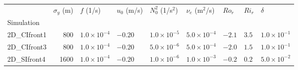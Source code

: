\begin{tabular}{lrlllllll}
\toprule
{} &  $\sigma_y$ (m) &             $f$ (1/s) & $u_0$ (m/s) &     $N^2_0$ (1/s$^2$) &     $\nu_e$ (m$^2$/s) &  $Ro_r$ & $Ri_r$ &              $\delta$ \\
Simulation   &                 &                       &             &                       &                       &         &        &                       \\
\midrule
2D\_CIfront1 &             800 &  $1.0 \times 10^{-4}$ &     $-0.20$ &  $1.0 \times 10^{-5}$ &  $5.0 \times 10^{-4}$ &  $-2.1$ &  $3.5$ &  $1.0 \times 10^{-1}$ \\
2D\_CIfront3 &             800 &  $1.0 \times 10^{-4}$ &     $-0.20$ &  $5.0 \times 10^{-6}$ &  $5.0 \times 10^{-4}$ &  $-2.0$ &  $1.5$ &  $1.0 \times 10^{-1}$ \\
2D\_SIfront4 &            1600 &  $1.0 \times 10^{-4}$ &     $-0.20$ &  $1.0 \times 10^{-6}$ &  $1.0 \times 10^{-3}$ &  $-0.2$ &  $0.2$ &  $5.0 \times 10^{-2}$ \\
\bottomrule
\end{tabular}
